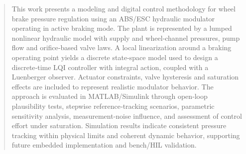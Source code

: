 \documentclass[a4paper]{ifacconf}
\begin{document}
\begin{frontmatter}
      \renewcommand{\abstractname}{{\bf Abstract:~}}
      \begin{abstract}                %

         This work presents a modeling and digital control methodology for wheel brake pressure regulation using an ABS/ESC hydraulic modulator operating in active braking mode. The plant is represented by a lumped nonlinear hydraulic model with supply and wheel‑channel pressures, pump flow and orifice‑based valve laws. A local linearization around a braking operating point yields a discrete state‑space model used to design a discrete‑time LQI controller with integral action, coupled with a Luenberger observer. Actuator constraints, valve hysteresis and saturation effects are included to represent realistic modulator behavior. The approach is evaluated in MATLAB/Simulink through open‑loop plausibility tests, stepwise reference‑tracking scenarios, parametric sensitivity analysis, measurement‑noise influence, and assessment of control effort under saturation. Simulation results indicate consistent pressure tracking within physical limits and coherent dynamic behavior, supporting future embedded implementation and bench/HIL validation.


\end{abstract}
\end{frontmatter}
\end{document}

